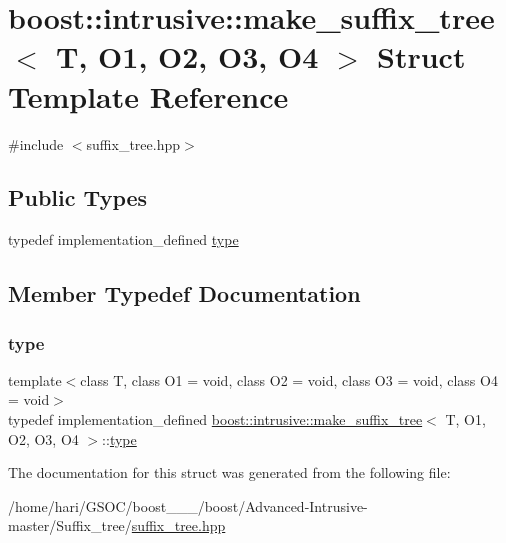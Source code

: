 \hypertarget{structboost_1_1intrusive_1_1make__suffix__tree}{}\section{boost\+:\+:intrusive\+:\+:make\+\_\+suffix\+\_\+tree$<$ T, O1, O2, O3, O4 $>$ Struct Template Reference}
\label{structboost_1_1intrusive_1_1make__suffix__tree}


{\ttfamily \#include $<$suffix\+\_\+tree.\+hpp$>$}

\subsection*{Public Types}
\begin{DoxyCompactItemize}
\item 
typedef implementation\+\_\+defined \hyperlink{structboost_1_1intrusive_1_1make__suffix__tree_af7a1a8fa230f6e5be3305bdc0f8287b1}{type}
\end{DoxyCompactItemize}


\subsection{Member Typedef Documentation}
\mbox{\label{structboost_1_1intrusive_1_1make__suffix__tree_af7a1a8fa230f6e5be3305bdc0f8287b1}} 
\subsubsection{\texorpdfstring{type}{type}}
{\footnotesize\ttfamily template$<$class T, class O1 = void, class O2 = void, class O3 = void, class O4 = void$>$ \\
typedef implementation\+\_\+defined \hyperlink{structboost_1_1intrusive_1_1make__suffix__tree}{boost\+::intrusive\+::make\+\_\+suffix\+\_\+tree}$<$ T, O1, O2, O3, O4 $>$\+::\hyperlink{structboost_1_1intrusive_1_1make__suffix__tree_af7a1a8fa230f6e5be3305bdc0f8287b1}{type}}



The documentation for this struct was generated from the following file\+:\begin{DoxyCompactItemize}
\item 
/home/hari/\+G\+S\+O\+C/boost\+\_\+\_\+\_/boost/\+Advanced-\/\+Intrusive-\/master/\+Suffix\+\_\+tree/\hyperlink{suffix__tree_8hpp}{suffix\+\_\+tree.\+hpp}\end{DoxyCompactItemize}
